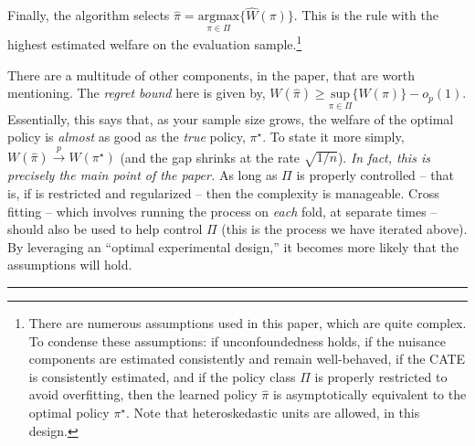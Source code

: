 \documentclass[12pt,letterpaper,doublespace, oneside]{article}
\begin{document}
Finally, the algorithm selects $\hat{\pi} = \underset{\pi \in \Pi}{\text{argmax}}\{\hat{W}(\pi)\}$. This is the rule with the highest estimated welfare on the evaluation sample.\footnote{
There are numerous assumptions used in this paper, which are quite complex. To condense these assumptions: if unconfoundedness holds, if the nuisance components are estimated consistently and remain well-behaved, if the CATE is consistently estimated, and if the policy class $\Pi$ is properly restricted to avoid overfitting, then the learned policy $\hat{\pi}$ is asymptotically equivalent to the optimal policy $\pi^\star$. Note that heteroskedastic units are allowed, in this design.}  

There are a multitude of other components, in the paper, that are worth mentioning. The \emph{regret bound} here is given by, $W(\hat{\pi}) \geq \underset{\pi \in \Pi}{\text{sup}}\{W(\pi)\} - o_p(1)$. Essentially, this says that, as your sample size grows, the welfare of the optimal policy is \emph{almost} as good as the \emph{true} policy, $\pi^\star$. To state it more simply, $W(\hat{\pi}) \overset{p}{\to} W(\pi^\star)$ (and the gap shrinks at the rate $\sqrt{1/n}$). \emph{In fact, this is precisely the main point of the paper.} As long as $\Pi$ is properly controlled -- that is, if is restricted and regularized -- then the complexity is manageable. Cross fitting -- which involves running the process on \emph{each} fold, at separate times -- should also be used to help control $\Pi$ (this is the process we have iterated above). By leveraging an \enquote{optimal experimental design,} it becomes more likely that the assumptions will hold.
\noindent\rule{\linewidth}{0.4pt}
\end{document}
